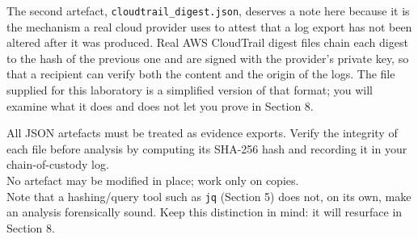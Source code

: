 \noindent
The second artefact, \texttt{cloudtrail\_digest.json}, deserves a note here because it is the mechanism a real cloud provider uses to attest that a log export has not been altered after it was produced. Real AWS CloudTrail digest files chain each digest to the hash of the previous one and are signed with the provider's private key, so that a recipient can verify both the content and the origin of the logs. The file supplied for this laboratory is a simplified version of that format; you will examine what it does and does not let you prove in Section 8.
\medskip

\begin{warningbox}
All JSON artefacts must be treated as evidence exports. Verify the integrity of each file
before analysis by computing its SHA-256 hash and recording it in your chain-of-custody log.\\
No artefact may be modified in place; work only on copies.\\
Note that a hashing/query tool such as \texttt{jq} (Section 5) does not, on its own, make an
analysis forensically sound. Keep this
distinction in mind: it will resurface in Section 8.
\end{warningbox}
